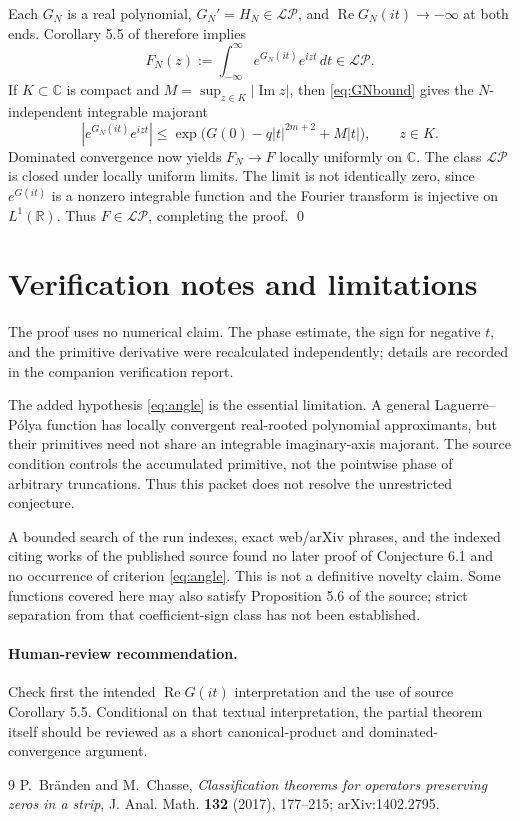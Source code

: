 \documentclass[11pt]{article}
\newcommand{\LP}{\mathcal{L}\!\mathcal{P}}
\begin{document}
Each $G_N$ is a real polynomial, $G_N'=H_N\in\LP$, and
$\operatorname{Re}G_N(it)\to-\infty$ at both ends.  Corollary 5.5 of
\cite{BrandenChasse} therefore implies
\[
 F_N(z):=\int_{-\infty}^{\infty}e^{G_N(it)}e^{izt}\,dt\in\LP.
\]
If $K\subset\mathbb{C}$ is compact and
$M=\sup_{z\in K}|\operatorname{Im}z|$, then \eqref{eq:GNbound} gives the
$N$-independent integrable majorant
\[
 |e^{G_N(it)}e^{izt}|
 \le \exp\bigl(G(0)-q|t|^{2m+2}+M|t|\bigr),
 \qquad z\in K.
\]
Dominated convergence now yields $F_N\to F$ locally uniformly on
$\mathbb{C}$.  The class $\LP$ is closed under locally uniform limits.  The
limit is not identically zero, since $e^{G(it)}$ is a nonzero integrable
function and the Fourier transform is injective on $L^1(\mathbb{R})$.
Thus $F\in\LP$, completing the proof. \qed

\section{Verification notes and limitations}

The proof uses no numerical claim.  The phase estimate, the sign for negative
$t$, and the primitive derivative were recalculated independently; details are
recorded in the companion verification report.

The added hypothesis \eqref{eq:angle} is the essential limitation.  A general
Laguerre--P\'olya function has locally convergent real-rooted polynomial
approximants, but their primitives need not share an integrable imaginary-axis
majorant.  The source condition controls the accumulated primitive, not the
pointwise phase of arbitrary truncations.  Thus this packet does not resolve
the unrestricted conjecture.

A bounded search of the run indexes, exact web/arXiv phrases, and the indexed
citing works of the published source found no later proof of Conjecture 6.1
and no occurrence of criterion \eqref{eq:angle}.  This is not a definitive
novelty claim.  Some functions covered here may also satisfy Proposition 5.6
of the source; strict separation from that coefficient-sign class has not been
established.

\paragraph{Human-review recommendation.}
Check first the intended $\operatorname{Re}G(it)$ interpretation and the use of
source Corollary 5.5.  Conditional on that textual interpretation, the partial
theorem itself should be reviewed as a short canonical-product and dominated-
convergence argument.

\begin{thebibliography}{9}
P.~Br\"anden and M.~Chasse,
\emph{Classification theorems for operators preserving zeros in a strip},
J. Anal. Math. \textbf{132} (2017), 177--215;
arXiv:1402.2795.
\end{thebibliography}
\end{document}

